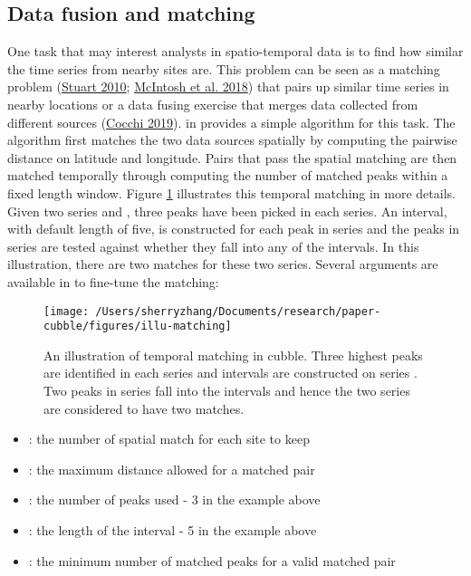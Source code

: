 \documentclass{article}
\providecommand{\tightlist}{%
  \setlength{\itemsep}{0pt}\setlength{\parskip}{0pt}}
\begin{document}
\hypertarget{matching}{%
\subsection{Data fusion and matching}\label{matching}}

One task that may interest analysts in spatio-temporal data is to find how similar the time series from nearby sites are. This problem can be seen as a matching problem (\protect\hyperlink{ref-stuart2010matching}{Stuart 2010}; \protect\hyperlink{ref-mcintosh2018using}{McIntosh et al. 2018}) that pairs up similar time series in nearby locations or a data fusing exercise that merges data collected from different sources (\protect\hyperlink{ref-cocchi2019data}{Cocchi 2019}).  in  provides a simple algorithm for this task. The algorithm first matches the two data sources spatially by computing the pairwise distance on latitude and longitude. Pairs that pass the spatial matching are then matched temporally through computing the number of matched peaks within a fixed length window. Figure \ref{fig:illu-matching} illustrates this temporal matching in more details. Given two series  and , three peaks have been picked in each series. An interval, with default length of five, is constructed for each peak in series  and the peaks in series  are tested against whether they fall into any of the intervals. In this illustration, there are two matches for these two series. Several arguments are available in  to fine-tune the matching:

\begin{figure}
\texttt{[image: /Users/sherryzhang/Documents/research/paper-cubble/figures/illu-matching]} \caption{An illustration of temporal matching in cubble. Three highest peaks are identified in each series and intervals are constructed on series . Two peaks in series  fall into the intervals and hence the two series are considered to have two matches.}\label{fig:illu-matching}
\end{figure}

\begin{itemize}
\tightlist
\item
  : the number of spatial match for each site to keep
\item
  : the maximum distance allowed for a matched pair
\item
  : the number of peaks used - 3 in the example above
\item
  : the length of the interval - 5 in the example above
\item
  : the minimum number of matched peaks for a valid matched pair
\end{itemize}
\end{document}
